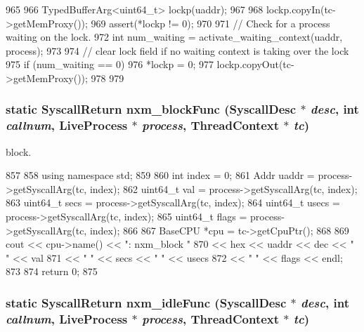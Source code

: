 \begin{DoxyCode}
965     {
966         TypedBufferArg<uint64_t> lockp(uaddr);
967 
968         lockp.copyIn(tc->getMemProxy());
969         assert(*lockp != 0);
970 
971         // Check for a process waiting on the lock.
972         int num_waiting = activate_waiting_context(uaddr, process);
973 
974         // clear lock field if no waiting context is taking over the lock
975         if (num_waiting == 0) {
976             *lockp = 0;
977             lockp.copyOut(tc->getMemProxy());
978         }
979     }
\end{DoxyCode}
\hypertarget{classTru64_ad497f5d8e1f57340b73ad9ea52b88dd3}{
\subsubsection[{nxm\_\-blockFunc}]{\setlength{\rightskip}{0pt plus 5cm}static {\bf SyscallReturn} nxm\_\-blockFunc ({\bf SyscallDesc} $\ast$ {\em desc}, \/  int {\em callnum}, \/  {\bf LiveProcess} $\ast$ {\em process}, \/  {\bf ThreadContext} $\ast$ {\em tc})}}
\label{classTru64_ad497f5d8e1f57340b73ad9ea52b88dd3}


block. 


\begin{DoxyCode}
857     {
858         using namespace std;
859 
860         int index = 0;
861         Addr uaddr = process->getSyscallArg(tc, index);
862         uint64_t val = process->getSyscallArg(tc, index);
863         uint64_t secs = process->getSyscallArg(tc, index);
864         uint64_t usecs = process->getSyscallArg(tc, index);
865         uint64_t flags = process->getSyscallArg(tc, index);
866 
867         BaseCPU *cpu = tc->getCpuPtr();
868 
869         cout << cpu->name() << ": nxm_block "
870              << hex << uaddr << dec << " " << val
871              << " " << secs << " " << usecs
872              << " " << flags << endl;
873 
874         return 0;
875     }
\end{DoxyCode}
\hypertarget{classTru64_a7d672681a6c03ce2f3d8e64b159d23d7}{
\subsubsection[{nxm\_\-idleFunc}]{\setlength{\rightskip}{0pt plus 5cm}static {\bf SyscallReturn} nxm\_\-idleFunc ({\bf SyscallDesc} $\ast$ {\em desc}, \/  int {\em callnum}, \/  {\bf LiveProcess} $\ast$ {\em process}, \/  {\bf ThreadContext} $\ast$ {\em tc})}}
\label{classTru64_a7d672681a6c03ce2f3d8e64b159d23d7}


